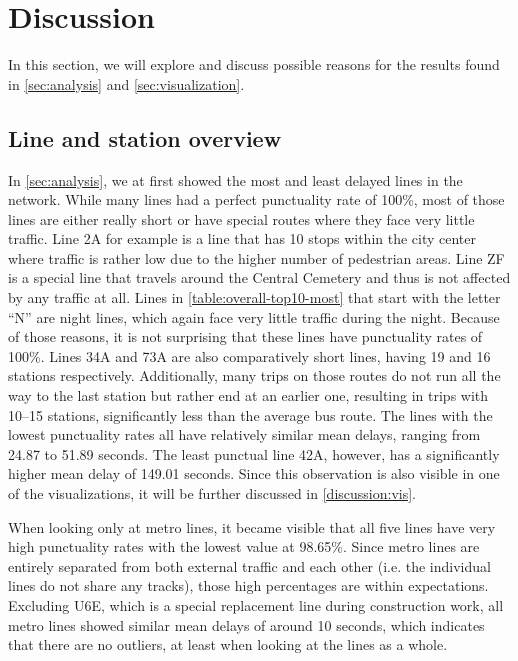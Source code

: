 \section{Discussion}
\label{sec:discussion}

In this section, we will explore and discuss possible reasons for the results found in \cref{sec:analysis} and \cref{sec:visualization}.

\subsection{Line and station overview}

In \cref{sec:analysis}, we at first showed the most and least delayed lines in the network. While many lines had a perfect punctuality rate of 100\%, most of those lines are either really short or have special routes where they face very little traffic. Line 2A for example is a line that has 10 stops within the city center where traffic is rather low due to the higher number of pedestrian areas. Line ZF is a special line that travels around the Central Cemetery and thus is not affected by any traffic at all. Lines in \cref{table:overall-top10-most} that start with the letter \enquote{N} are night lines, which again face very little traffic during the night. Because of those reasons, it is not surprising that these lines have punctuality rates of 100\%. Lines 34A and 73A are also comparatively short lines, having 19 and 16 stations respectively. Additionally, many trips on those routes do not run all the way to the last station but rather end at an earlier one, resulting in trips with 10--15 stations, significantly less than the average bus route. The lines with the lowest punctuality rates all have relatively similar mean delays, ranging from 24.87 to 51.89 seconds. The least punctual line 42A, however, has a significantly higher mean delay of 149.01 seconds. Since this observation is also visible in one of the visualizations, it will be further discussed in \cref{discussion:vis}.

When looking only at metro lines, it became visible that all five lines have very high punctuality rates with the lowest value at 98.65\%. Since metro lines are entirely separated from both external traffic and each other (i.e. the individual lines do not share any tracks), those high percentages are within expectations. Excluding U6E, which is a special replacement line during construction work, all metro lines showed similar mean delays of around 10 seconds, which indicates that there are no outliers, at least when looking at the lines as a whole.

